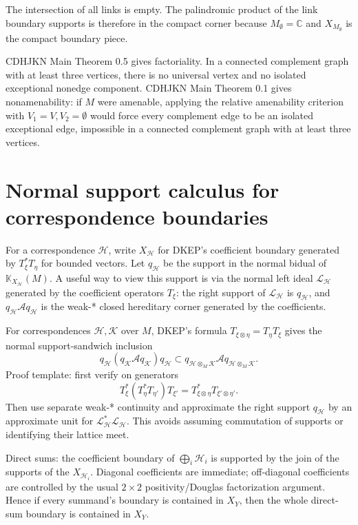 \documentclass{article}
\begin{document}
The intersection of all links is empty.  The palindromic product of the link
boundary supports is therefore in the compact corner because
$M_\emptyset=\mathbb C$ and $X_{M_\emptyset}$ is the compact boundary piece.

CDHJKN Main Theorem 0.5 gives factoriality.  In a connected complement graph
with at least three vertices, there is no universal vertex and no isolated
exceptional nonedge component.  CDHJKN Main Theorem 0.1 gives nonamenability:
if $M$ were amenable, applying the relative amenability criterion with
$V_1=V,V_2=\emptyset$ would force every complement edge to be an isolated
exceptional edge, impossible in a connected complement graph with at least
three vertices.



\section*{Normal support calculus for correspondence boundaries}

For a correspondence $\mathcal H$, write $X_{\mathcal H}$ for DKEP's
coefficient boundary generated by $T_\xi^*T_\eta$ for bounded vectors.
Let $q_{\mathcal H}$ be the support in the normal bidual of
$\mathbb K_{X_{\mathcal H}}(M)$.  A useful way to view this support is via the
normal left ideal $\mathcal L_{\mathcal H}$ generated by the coefficient
operators $T_\xi$: the right support of $\mathcal L_{\mathcal H}$ is
$q_{\mathcal H}$, and $q_{\mathcal H}\mathcal A q_{\mathcal H}$ is the weak-*
closed hereditary corner generated by the coefficients.

For correspondences $\mathcal H,\mathcal K$ over $M$, DKEP's formula
$T_{\xi\otimes\eta}=T_\eta T_\xi$ gives the normal support-sandwich inclusion
\[
 q_{\mathcal H}(q_{\mathcal K}\mathcal A q_{\mathcal K})q_{\mathcal H}
 \subset
 q_{\mathcal H\otimes_M\mathcal K}\mathcal A
 q_{\mathcal H\otimes_M\mathcal K}.
\]
Proof template: first verify on generators
\[
T_\xi^*(T_\eta^*T_{\eta'})T_{\xi'}
 =T_{\xi\otimes\eta}^*T_{\xi'\otimes\eta'}.
\]
Then use separate weak-* continuity and approximate the right support
$q_{\mathcal H}$ by an approximate unit for
$\mathcal L_{\mathcal H}^*\mathcal L_{\mathcal H}$.  This avoids assuming
commutation of supports or identifying their lattice meet.

Direct sums: the coefficient boundary of $\bigoplus_i\mathcal H_i$ is supported
by the join of the supports of the $X_{\mathcal H_i}$.  Diagonal coefficients
are immediate; off-diagonal coefficients are controlled by the usual
$2\times2$ positivity/Douglas factorization argument.  Hence if every summand's
boundary is contained in $X_Y$, then the whole direct-sum boundary is contained
in $X_Y$.
\end{document}
